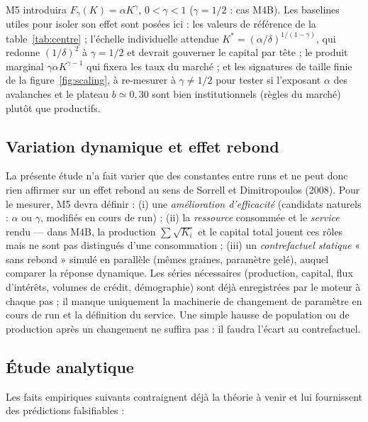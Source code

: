 \documentclass[11pt,a4paper]{article}
\begin{document}
M5 introduira $F_\gamma(K)=\alpha K^\gamma$, $0<\gamma<1$
($\gamma=1/2$ : cas M4B). Les baselines utiles pour isoler son effet
sont posées ici : les valeurs de référence de la
table~\ref{tab:centre} ; l'échelle individuelle attendue
$K^\ast=(\alpha/\delta)^{1/(1-\gamma)}$, qui redonne $(1/\delta)^2$ à
$\gamma=1/2$ et devrait gouverner le capital par tête ; le produit
marginal $\gamma\alpha K^{\gamma-1}$ qui fixera les taux du marché ;
et les signatures de taille finie de la figure~\ref{fig:scaling}, à
re-mesurer à $\gamma\ne1/2$ pour tester si l'exposant $\alpha$ des
avalanches et le plateau $b\simeq0{,}30$ sont bien institutionnels
(règles du marché) plutôt que productifs.

\subsection{Variation dynamique et effet rebond}

La présente étude n'a fait varier que des constantes entre runs et ne
peut donc rien affirmer sur un effet rebond au sens de Sorrell et
Dimitropoulos (2008). Pour le mesurer, M5 devra définir : (i) une
\emph{amélioration d'efficacité} (candidats naturels : $\alpha$ ou
$\gamma$, modifiés en cours de run) ; (ii) la \emph{ressource}
consommée et le \emph{service} rendu — dans M4B, la production
$\sum\sqrt{K_i}$ et le capital total jouent ces rôles mais ne sont pas
distingués d'une consommation ; (iii) un \emph{contrefactuel statique}
« sans rebond » simulé en parallèle (mêmes graines, paramètre gelé),
auquel comparer la réponse dynamique. Les séries nécessaires
(production, capital, flux d'intérêts, volumes de crédit, démographie)
sont déjà enregistrées par le moteur à chaque pas ; il manque
uniquement la machinerie de changement de paramètre en cours de run et
la définition du service. Une simple hausse de population ou de
production après un changement ne suffira pas : il faudra l'écart au
contrefactuel.

\subsection{Étude analytique}

Les faits empiriques suivants contraignent déjà la théorie à venir et
lui fournissent des prédictions falsifiables :
\end{document}
